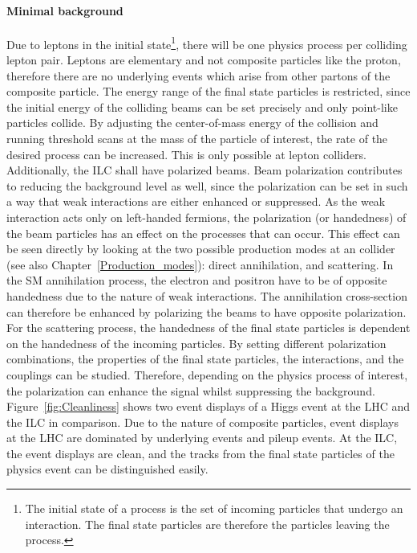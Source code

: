 \paragraph{Minimal background}
Due to leptons in the initial state\footnote{The initial state of a process is the set of incoming particles that undergo an interaction. The final state particles are therefore the particles leaving the process.}, there will be one physics process per colliding lepton pair.
Leptons are elementary and not composite particles like the proton, therefore there are no underlying events which arise from other partons of the composite particle.
The energy range of the final state particles is restricted, since the initial energy of the colliding beams can be set precisely and only point-like particles collide.
By adjusting the center-of-mass energy of the collision and running threshold scans at the mass of the particle of interest, the rate of the desired process can be increased.
This is only possible at lepton colliders.
\\Additionally, the ILC shall have polarized beams.
Beam polarization contributes to reducing the background level as well, since the polarization can be set in such a way that weak interactions are either enhanced or suppressed.
As the weak interaction acts only on left-handed fermions, the polarization (or handedness) of the beam particles has an effect on the processes that can occur.
This effect can be seen directly by looking at the two possible production modes at an \positron\electron collider (see also Chapter~\ref{Production_modes}):
direct \positron\electron annihilation, and \positron\electron scattering.
In the SM annihilation process, the electron and positron have to be of opposite handedness due to the nature of weak interactions.
The annihilation cross-section can therefore be enhanced by polarizing the beams to have opposite polarization.
For the \positron\electron scattering process, the handedness of the final state particles is dependent on the handedness of the incoming particles.
By setting different polarization combinations, the properties of the final state particles, the interactions, and the couplings can be studied. %
Therefore, depending on the physics process of interest, the polarization can enhance the signal whilst suppressing the background. 
\\Figure~\ref{fig:Cleanliness} shows two event displays of a Higgs event at the LHC and the ILC in comparison.
Due to the nature of composite particles, event displays at the LHC are dominated by underlying events and pileup events.
At the ILC, the event displays are clean, and the tracks from the final state particles of the physics event can be distinguished easily.

